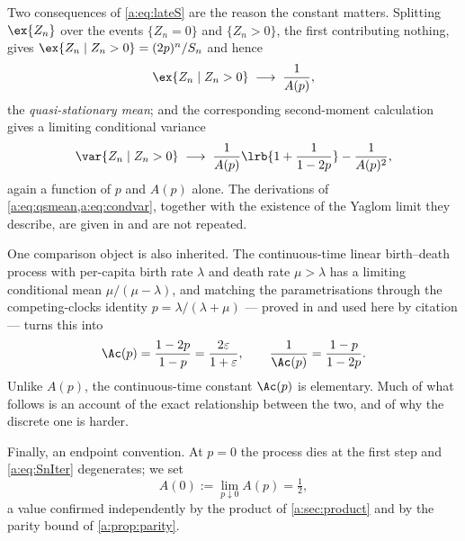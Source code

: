 Two consequences of \cref{a:eq:lateS} are the reason the constant matters. Splitting
$\ex{Z_n}$ over the events $\{Z_n=0\}$ and $\{Z_n>0\}$, the first contributing
nothing, gives $\ex{Z_n\mid Z_n>0} = (2p)^n/S_n$ and hence
\begin{equation}
\label{a:eq:qsmean}
\ex{Z_n\mid Z_n>0}\;\longrightarrow\;\frac{1}{A(p)},
\end{equation}
the \emph{quasi-stationary mean}; and the corresponding second-moment calculation
gives a limiting conditional variance
\begin{equation}
\label{a:eq:condvar}
\var{Z_n\mid Z_n>0}\;\longrightarrow\;
\frac{1}{A(p)}\lrb{1+\frac{1}{1-2p}} - \frac{1}{A(p)^2} ,
\end{equation}
again a function of $p$ and $A(p)$ alone. The derivations of
\cref{a:eq:qsmean,a:eq:condvar}, together with the existence of the Yaglom limit
they describe, are given in \ChM{} and are not repeated.

One comparison object is also inherited. The continuous-time linear birth--death
process with per-capita birth rate $\lambda$ and death rate $\mu>\lambda$ has a
limiting conditional mean $\mu/(\mu-\lambda)$, and matching the parametrisations
through the competing-clocks identity $p=\lambda/(\lambda+\mu)$ --- proved in
\ChM{} and used here by citation --- turns this into
\begin{equation}
\label{a:eq:Acts}
\Ac(p) = \frac{1-2p}{1-p} = \frac{2\varepsilon}{1+\varepsilon},
\qquad
\frac{1}{\Ac(p)} = \frac{1-p}{1-2p} .
\end{equation}
Unlike $A(p)$, the continuous-time constant $\Ac(p)$ is elementary. Much of what
follows is an account of the exact relationship between the two, and of why the
discrete one is harder.

Finally, an endpoint convention. At $p=0$ the process dies at the first step and
\cref{a:eq:SnIter} degenerates; we set
\begin{equation}
\label{a:eq:endpoint}
A(0) := \lim_{p\downarrow0}A(p) = \tfrac12,
\end{equation}
a value confirmed independently by the product of \cref{a:sec:product} and by the
parity bound of \cref{a:prop:parity}.
